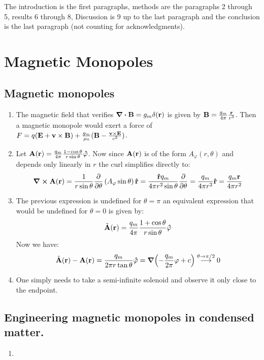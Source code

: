 \documentclass[10pt,a4paper]{book}
\begin{document}
\subsection{}
The introduction is the first paragraphs, methods are the paragraphs 2 through 5, results 6 through 8, Discussion is 9 up to the last paragraph and the conclusion is the last paragraph (not counting for acknowledgments).

\subsection{}

\chapter{Magnetic Monopoles}
\section{Magnetic monopoles}
\begin{enumerate}

\item The magnetic field that verifies $\div \vb{B} = g_m \delta(\vb{r})$ is given by $\vb{B} = \frac{g_m}{4\pi}\frac{\vb{r}}{r^3}$. Then a magnetic monopole would exert a force of $F = q(\vb{E} + \vb{v}\times \vb{B}) + \frac{g_m}{\mu_0}(\vb{B} - \frac{\vb{v} \times \vb{E}}{c^2})$.

\item Let $\vb{A}(\vb{r}) = \frac{q_m}{4\pi}\frac{1 - \cos \theta}{r \sin \theta} \vu{\varphi}$. Now since $\vb{A}(\vb{r})$ is of the form $A_\varphi(r, \theta)$ and depends only linearly in $r$ the curl simplifies directly to:
\[
\curl \vb{A}(\vb{r}) = \frac{1}{r \sin \theta} \pdv{}{\theta}\left( A_\varphi \sin \theta \right) \vu{r} = \frac{\vu{r} q_m}{4 \pi r^2 \sin \theta} \pdv{}{\theta} (1 - \cos \theta) = \frac{q_m}{4 \pi r^2} \vu{r} = \frac{q_m \vb{r}}{4 \pi r^2 }
\]

\item The previous expression is undefined for $\theta = \pi$ an equivalent expression that would be undefined for $\theta = 0$ is given by:
\[
\tilde{\vb{A}}(\vb{r}) = \frac{q_m}{4\pi} \frac{1 + \cos \theta}{r \sin \theta} \vu{\varphi}
\]
Now we have:
\[
\tilde{\vb{A}}(\vb{r}) - \vb{A}(\vb{r}) = \frac{q_m}{2 \pi r \tan \theta} \vu{\varphi} = \grad(-\frac{q_m}{2\pi} \varphi + c) \stackrel{\theta \to \pi/2}{\longrightarrow} 0
\]

\item One simply needs to take a semi-infinite solenoid and observe it only close to the endpoint.

\end{enumerate}

\section{Engineering magnetic monopoles in condensed matter.}

\begin{enumerate}

\item 

\end{enumerate}
\end{document}
